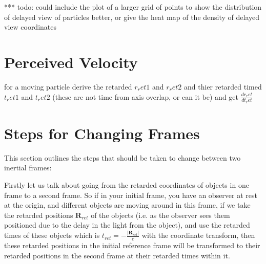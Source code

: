 *** todo: could include the plot of a larger grid of points to show the distribution of delayed view of particles better, or give the heat map of the density of delayed view coordinates

\section{Perceived Velocity} \label{sect: Perceived Velocity}

for a moving particle derive the retarded $r_ret1$ and $r_ret2$ and thier retarded timed $t_ret1$ and $t_ret2$ (these are not time from axis overlap, or can it be) and get $\frac{dr_ret}{dt_ret}$





\section{Steps for Changing Frames} \label{sect: Steps for Changing Frames}

This section outlines the steps that should be taken to change between two inertial frames: \newline

Firstly let us talk about going from the retarded coordinates of objects in one frame to a second frame.
So if in your initial frame, you have an observer at rest at the origin, and different objects are moving around in this frame, if we take the retarded positions $\mathbf{R}_{ret}$ of the objects (i.e.
as the observer sees them positioned due to the delay in the light from the object), and use the retarded times of these objects which is ${t}_{ret} =-\frac{|\mathbf{R}_{ret}|}{c}$ with the coordinate transform, then these retarded positions in the initial reference frame will be transformed to their retarded positions in the second frame at their retarded times within it.
\newline

